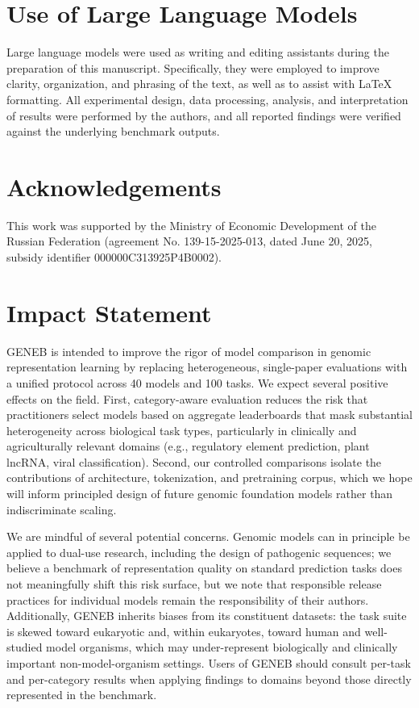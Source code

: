 \documentclass{llmxive}
\begin{document}
\section{Use of Large Language Models}
\label{app:llm_usage}

Large language models were used as writing and editing assistants
during the preparation of this manuscript. Specifically, they were
employed to improve clarity, organization, and phrasing of the
text, as well as to assist with LaTeX formatting. All experimental
design, data processing, analysis, and interpretation of results
were performed by the authors, and all reported findings were
verified against the underlying benchmark outputs.

\section*{Acknowledgements}

This work was supported by the Ministry of Economic Development of the Russian Federation (agreement No. 139-15-2025-013, dated June 20, 2025, subsidy identifier 000000C313925P4B0002).

\section*{Impact Statement}

GENEB is intended to improve the rigor of model comparison in
genomic representation learning by replacing heterogeneous,
single-paper evaluations with a unified protocol across 40 models
and 100 tasks. We expect several positive effects on the field.
First, category-aware evaluation reduces the risk that
practitioners select models based on aggregate leaderboards that
mask substantial heterogeneity across biological task types,
particularly in clinically and agriculturally relevant domains
(e.g., regulatory element prediction, plant lncRNA, viral
classification). Second, our controlled comparisons isolate the
contributions of architecture, tokenization, and pretraining
corpus, which we hope will inform principled design of future
genomic foundation models rather than indiscriminate scaling.

We are mindful of several potential concerns. Genomic models can
in principle be applied to dual-use research, including the design
of pathogenic sequences; we believe a benchmark of representation
quality on standard prediction tasks does not meaningfully shift
this risk surface, but we note that responsible release practices
for individual models remain the responsibility of their authors.
Additionally, GENEB inherits biases from its constituent datasets:
the task suite is skewed toward eukaryotic and, within eukaryotes,
toward human and well-studied model organisms, which may
under-represent biologically and clinically important
non-model-organism settings. Users of GENEB should consult
per-task and per-category results when applying findings to
domains beyond those directly represented in the benchmark.
\end{document}
